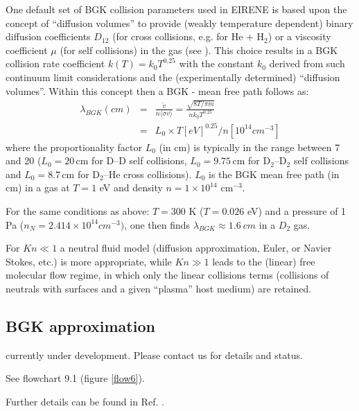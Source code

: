 One default set of BGK collision parameters used in EIRENE is based upon
the concept of ``diffusion volumes'' to provide (weakly temperature dependent) binary diffusion coefficients $D_{12}$ (for cross collisions, e.g. for He + H$_2$) or a viscosity coefficient $\mu$ (for self collisions) in the gas (see \cite{kn:Reiter94}). This choice results in a BGK collision rate coefficient $k(T)= k_0 T^{0.25}$  with the constant $k_0$ derived
from such continuum limit considerations and the (experimentally determined) ``diffusion volumes''. Within this concept then a BGK - mean free path \cite{kn:Kotov-Dis} follows as:
\begin{eqnarray}
\lambda_{BGK} (cm) &= &\frac{\tilde{v}}{n \langle \sigma v\rangle} =  \frac{\sqrt{8T/\pi m}} {n k_0 T^{0.25}} \nonumber \\
& = & L_0 \times T[eV]^{0.25} / n[10^{14} cm^{-3}]
\end{eqnarray}
where the proportionality factor $L_0$ (in cm) is typically in the range between 7 and 20 ($L_0 = 20$\,cm for D--D self collisions, $L_0 = 9.75$\,cm for D$_2$--D$_2$ self collisions and $L_0 = 8.7$\,cm for D$_2$--He cross collisions). $L_0$ is the BGK mean free path (in cm) in a gas
at $T = 1$ eV and density $n =1 \times 10^{14}$ cm$^{-3}$.

For the same conditions as above: $T=300$ K ($T=0.026$ eV) and a pressure of 1 Pa ($n_N=2.414 \times 10^{14} cm^{-3} )$, one then finds $\lambda_{BGK}\approx 1.6 ~cm$
in a $D_2$ gas.



For $Kn\ll 1$
a neutral fluid model (diffusion approximation, Euler, or Navier Stokes, etc.) is more appropriate,
while $Kn \gg 1$ leads to the (linear) free molecular flow regime, in which
only the linear collisions terms (collisions of neutrals with surfaces and a
given ``plasma'' host medium) are retained.
\subsection{BGK approximation}\label{sec1-bgk}
currently under development. Please contact us for details and
status.

See flowchart 9.1 (figure \ref{flow6}).

Further details can be found in Ref. \cite{kn:Reiter96}.
\bigskip

